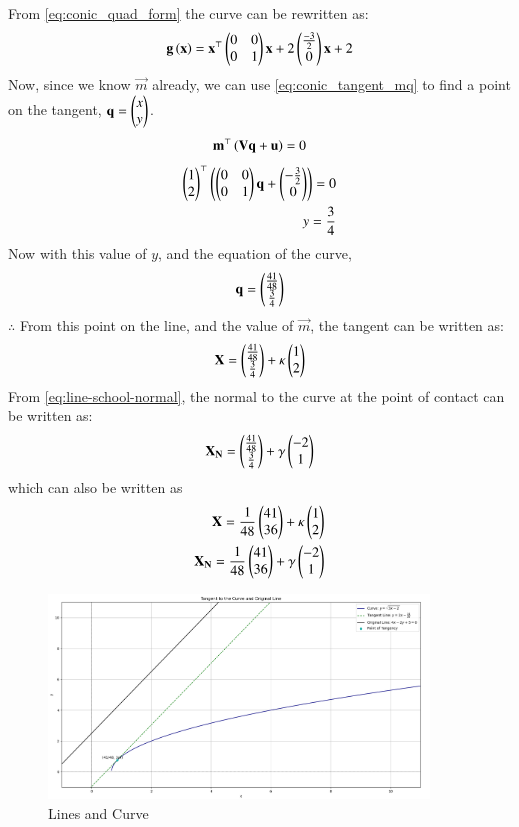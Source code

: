\documentclass[journal]{IEEEtran}
\begin{document}
From \eqref{eq:conic_quad_form} the curve can be rewritten as:
\begin{align}
    \mathbf{g}\left(\mathbf{x}\right) = \mathbf{x}^\top \begin{pmatrix}0&0\\0&1\end{pmatrix}\mathbf{x} + 2\begin{pmatrix}\frac{-3}{2}\\0\end{pmatrix}\mathbf{x}+2
\end{align}
Now, since we know $\vec{m}$ already, we can use \eqref{eq:conic_tangent_mq} to find a point on the tangent, $\mathbf{q}=\begin{pmatrix}x\\y\end{pmatrix}$.
\begin{align}
    \mathbf{m}^{\top}\left(\mathbf{V}\mathbf{q}+\mathbf{u}\right)=0
\end{align}
\begin{align}
    \begin{pmatrix}1\\2\end{pmatrix}^{\top}\left(\begin{pmatrix}0&0\\0&1\end{pmatrix}\mathbf{q}+\begin{pmatrix}-\frac{3}{2}\\0\end{pmatrix}\right)=0\\
    y=\frac{3}{4}
\end{align}
Now with this value of $y$, and the equation of the curve,
\begin{align}
    \mathbf{q}=\begin{pmatrix}\frac{41}{48}\\ \frac{3}{4}\end{pmatrix}
\end{align}
$\therefore$ From this point on the line, and the value of $\vec{m}$, the tangent can be written as:
\begin{align}
    \mathbf{X}=\begin{pmatrix}\frac{41}{48}\\\frac{3}{4}\end{pmatrix} + \kappa \begin{pmatrix}1\\2\end{pmatrix}
\end{align}
From \eqref{eq:line-school-normal}, the normal to the curve at the point of contact can be written as:
\begin{align}
	\mathbf{X_N}=\begin{pmatrix}\frac{41}{48}\\\frac{3}{4}\end{pmatrix} + \gamma \begin{pmatrix}-2\\1\end{pmatrix}
\end{align}
which can also be written as
\begin{align}
	\mathbf{X}=\frac{1}{48}\begin{pmatrix}41\\36\end{pmatrix} + \kappa \begin{pmatrix}1\\2\end{pmatrix} \\
	\mathbf{X_N}=\frac{1}{48}\begin{pmatrix}41\\36\end{pmatrix} + \gamma \begin{pmatrix}-2\\1\end{pmatrix}
\end{align}

\begin{figure}[h!]
\begin{center}
	\includegraphics[width=0.9\textwidth]{figs/Figure_1.png}
	\caption{Lines and Curve}
	\label{fig:9-9.3-15 - Figure -1}
\end{center}
\end{figure}
\end{document}
